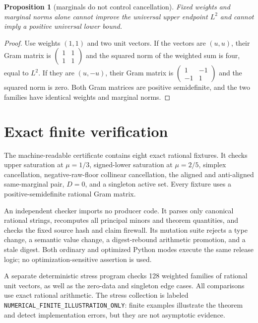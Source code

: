 \documentclass[11pt]{article}
\newtheorem{proposition}[theorem]{Proposition}
\theoremstyle{remark}
\begin{document}
\begin{proposition}[marginals do not control cancellation]\label{prop:marginal}
Fixed weights and marginal norms alone cannot improve the universal upper
endpoint $L^2$ and cannot imply a positive universal lower bound.
\end{proposition}

\begin{proof}
Use weights $(1,1)$ and two unit vectors.  If the vectors are $(u,u)$, their
Gram matrix is
$\left(\begin{smallmatrix}1&1\\1&1\end{smallmatrix}\right)$ and the squared
norm of the weighted sum is four, equal to $L^2$.  If they are $(u,-u)$, their
Gram matrix is
$\left(\begin{smallmatrix}1&-1\\-1&1\end{smallmatrix}\right)$ and the squared
norm is zero.  Both Gram matrices are positive semidefinite, and the two
families have identical weights and marginal norms.
\end{proof}

\section{Exact finite verification}

The machine-readable certificate contains eight exact rational fixtures.  It
checks upper saturation at $\mu=1/3$, signed-lower saturation at $\mu=2/5$,
simplex cancellation, negative-raw-floor collinear cancellation, the aligned
and anti-aligned same-marginal pair, $D=0$, and a singleton active set.  Every
fixture uses a positive-semidefinite rational Gram matrix.

An independent checker imports no producer code.  It parses only canonical
rational strings, recomputes all principal minors and theorem quantities, and
checks the fixed source hash and claim firewall.  Its mutation suite rejects a
type change, a semantic value change, a digest-rebound arithmetic promotion,
and a stale digest.  Both ordinary and optimized Python modes execute the same
release logic; no optimization-sensitive assertion is used.

A separate deterministic stress program checks 128 weighted families of
rational unit vectors, as well as the zero-data and singleton edge cases.  All
comparisons use exact rational arithmetic.  The stress collection is labeled
\texttt{NUMERICAL\_FINITE\_ILLUSTRATION\_ONLY}: finite examples illustrate the
theorem and detect implementation errors, but they are not asymptotic evidence.
\end{document}
